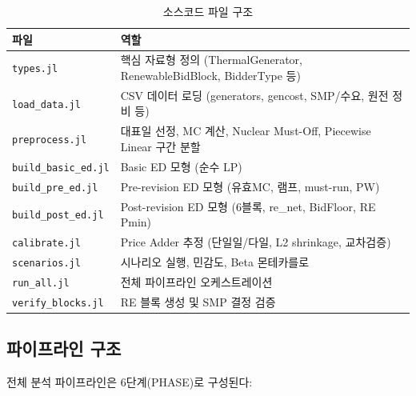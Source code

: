 \documentclass[11pt, a4paper]{article}
\begin{document}
\begin{table}[H]
\centering
\caption{소스코드 파일 구조}\label{tab:source_files}
\small
\begin{tabularx}{\textwidth}{lX}
\toprule
\textbf{파일} & \textbf{역할} \\
\midrule
\texttt{types.jl}          & 핵심 자료형 정의 (ThermalGenerator, RenewableBidBlock, BidderType 등) \\
\texttt{load\_data.jl}     & CSV 데이터 로딩 (generators, gencost, SMP/수요, 원전 정비 등) \\
\texttt{preprocess.jl}     & 대표일 선정, MC 계산, Nuclear Must-Off, Piecewise Linear 구간 분할 \\
\texttt{build\_basic\_ed.jl} & Basic ED 모형 (순수 LP) \\
\texttt{build\_pre\_ed.jl}   & Pre-revision ED 모형 (유효MC, 램프, must-run, PW) \\
\texttt{build\_post\_ed.jl}  & Post-revision ED 모형 (6블록, re\_net, BidFloor, RE Pmin) \\
\texttt{calibrate.jl}       & Price Adder 추정 (단일일/다일, L2 shrinkage, 교차검증) \\
\texttt{scenarios.jl}       & 시나리오 실행, 민감도, Beta 몬테카를로 \\
\texttt{run\_all.jl}        & 전체 파이프라인 오케스트레이션 \\
\texttt{verify\_blocks.jl}  & RE 블록 생성 및 SMP 결정 검증 \\
\bottomrule
\end{tabularx}
\end{table}

\subsection{파이프라인 구조}

전체 분석 파이프라인은 6단계(PHASE)로 구성된다:
\end{document}
